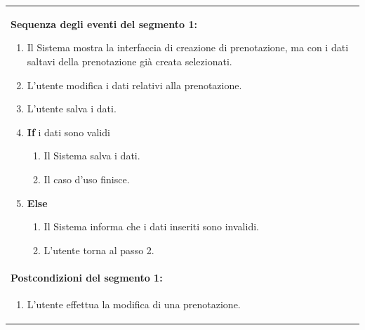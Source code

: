 \documentclass{article}
\begin{document}
\begin{table}[H]
\begin{tabular}{|p{\linewidth}|}
                        \vspace{-5pt} \\
                        \hline
                        \textbf{Sequenza degli eventi del segmento 1:}
                        \begin{enumerate}
                            \item Il Sistema mostra la interfaccia di creazione di prenotazione, ma con i dati saltavi della prenotazione già creata selezionati.
                            \item L'utente modifica i dati relativi alla prenotazione.
                            \item L'utente salva i dati.
                            \item \textbf{If} i dati sono validi
                            \begin{enumerate}
                                \item Il Sistema salva i dati.
                                \item Il caso d'uso finisce.
                            \end{enumerate}
                            \item \textbf{Else}
                            \begin{enumerate}
                                \item Il Sistema informa che i dati inseriti sono invalidi.
                                \item L'utente torna al passo 2.
                            \end{enumerate}
                        \end{enumerate} \\
                        \hline
                        \cellcolor{gray!20}
                        \textbf{Postcondizioni del segmento 1:} \\
                        \cellcolor{gray!20}
                        \begin{minipage}{\linewidth}
                            \begin{enumerate}
                                \item L'utente effettua la modifica di una prenotazione.
                            \end{enumerate}
                        \end{minipage} \\
                        \hline
                    \end{tabular}
                \end{table}
\end{document}

